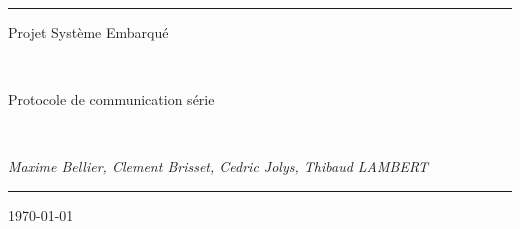 \documentclass[a4paper,10pt]{article}
\begin{document}
\noindent{}
\rule{\textwidth}{1pt}
\begin{flushright}
  {\Huge Projet Système Embarqué}

~

  {\Large Protocole de communication série}

~

  {\large \textit{ Maxime Bellier, Clement Brisset, Cedric Jolys, Thibaud LAMBERT }}
\end{flushright}
\rule{\textwidth}{1pt}
\thispagestyle{empty}
\begin{flushright} \today \end{flushright}

\newpage

\tableofcontents

\newpage





\end{document}
